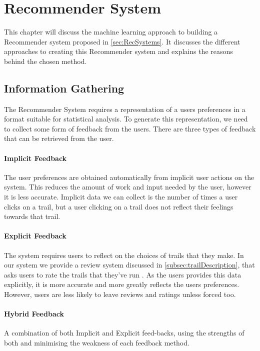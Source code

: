 \chapter{Recommender System} \label{chap:Recommender}

This chapter will discuss the machine learning approach to building a Recommender system proposed in \autoref{sec:RecSystems}. It discusses the different approaches to creating this Recommender system and explains the reasons behind the chosen method.

\section{Information Gathering}
The Recommender System requires a representation of a users preferences in a format suitable for statistical analysis. To generate this representation, we need to collect some form of feedback from the users. There are three types of feedback that can be retrieved from the user.

\subsubsection{Implicit Feedback}
The user preferences are obtained automatically from implicit user actions on the system. This reduces the amount of work and input needed by the user, however it is less accurate. Implicit data we can collect is the number of times a user clicks on a trail, but a user clicking on a trail does not reflect their feelings towards that trail.

\subsubsection{Explicit Feedback}
The system requires users to reflect on the choices of trails that they make. In our system we provide a review system discussed in \autoref{subsec:trailDescription}, that asks users to rate the trails that they've run \cite{jawaheer2010comparison}. As the users provides this data explicitly, it is more accurate and more greatly reflects the users preferences. However, users are less likely to leave reviews and ratings unless forced too.

\subsubsection{Hybrid Feedback}
A combination of both Implicit and Explicit feed-backs, using the strengths of both and minimising the weakness of each feedback method. 

